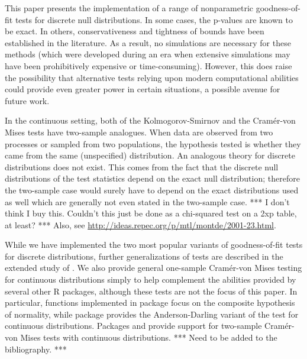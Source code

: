 This paper presents the implementation of a range of nonparametric
goodness-of-fit tests for discrete null distributions.  In some cases,
the p-values are known to be exact.  In others, conservativeness 
and tightness of bounds have been established in the literature.  As a result,
no simulations are necessary for these methods (which were developed during
an era when extensive simulations may have been prohibitively expensive
or time-consuming).
However, this does raise the possibility that alternative tests relying upon
modern computational abilities could provide even greater power in certain
situations, a possible avenue for future work.



In the continuous setting, both of 
the Kolmogorov-Smirnov and the Cram\'{e}r-von Mises tests
have two-sample analogues. When data are
observed from two processes or sampled from two populations, 
the hypothesis tested is 
whether they came from the same (unspecified) distribution. An
analogous theory for discrete distributions does not exist.
This comes from the fact that the discrete null distributions
of the test statistics depend on the exact null distribution; 
therefore the two-sample case would surely have to depend
on the exact distributions used as well %
which are generally not even stated in the two-sample case. 
*** I don't think I buy this. Couldn't this just be done as a
chi-squared test on a 2xp table, at least? *** Also,
see \url{http://ideas.repec.org/p/mtl/montde/2001-23.html}.

While we have implemented the two most popular variants of 
goodness-of-fit tests for discrete distributions, further 
generalizations of tests are described in the
extended study of \cite{dewev1973}.  We also provide general one-sample
Cram\'{e}r-von Mises testing for continuous distributions simply
to help complement the abilities provided by several other
R packages, although these tests are not the focus of this paper.
In particular, functions implemented in package  focus on the
composite hypothesis of normality, while
package  provides the Anderson-Darling variant
of the test for continuous distributions.  Packages
 and  provide support for
two-sample Cram\'{e}r-von Mises tests with continuous distributions.
 *** Need to be added
to the bibliography. ***




